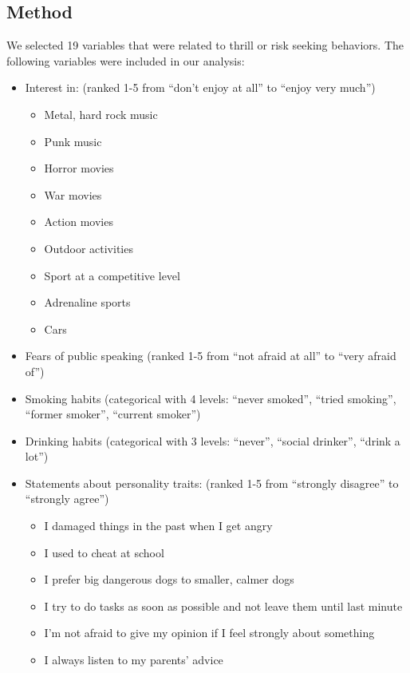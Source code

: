 \documentclass[]{article}
\providecommand{\tightlist}{%
  \setlength{\itemsep}{0pt}\setlength{\parskip}{0pt}}
\begin{document}
\subsection{Method}\label{method}

We selected 19 variables that were related to thrill or risk seeking
behaviors. The following variables were included in our analysis:

\begin{itemize}
\item
  Interest in: (ranked 1-5 from ``don't enjoy at all'' to ``enjoy very
  much'')

  \begin{itemize}
  \tightlist
  \item
    Metal, hard rock music
  \item
    Punk music
  \item
    Horror movies
  \item
    War movies
  \item
    Action movies
  \item
    Outdoor activities
  \item
    Sport at a competitive level
  \item
    Adrenaline sports
  \item
    Cars
  \end{itemize}
\item
  Fears of public speaking (ranked 1-5 from ``not afraid at all'' to
  ``very afraid of'')
\item
  Smoking habits (categorical with 4 levels: ``never smoked'', ``tried
  smoking'', ``former smoker'', ``current smoker'')
\item
  Drinking habits (categorical with 3 levels: ``never'', ``social
  drinker'', ``drink a lot'')
\item
  Statements about personality traits: (ranked 1-5 from ``strongly
  disagree'' to ``strongly agree'')

  \begin{itemize}
  \tightlist
  \item
    I damaged things in the past when I get angry
  \item
    I used to cheat at school
  \item
    I prefer big dangerous dogs to smaller, calmer dogs
  \item
    I try to do tasks as soon as possible and not leave them until last
    minute
  \item
    I'm not afraid to give my opinion if I feel strongly about something
  \item
    I always listen to my parents' advice
  \end{itemize}
\end{itemize}
\end{document}
